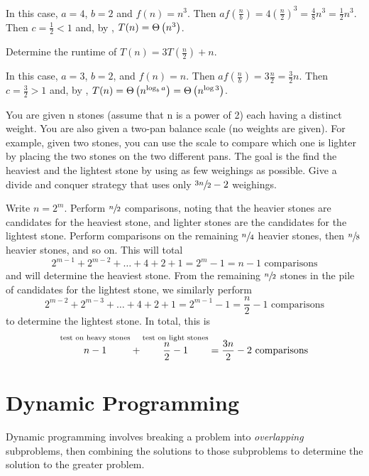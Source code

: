 \begin{solution}
    In this case, $a=4$, $b=2$ and $f(n)=n^3$. Then $af(\frac{n}{b})=4\left(\frac{n}{2}\right)^3=\frac{4}{8}n^3=\frac{1}{2}n^3$. Then $c=\frac{1}{2}<1$ and, by , $T(n)=\Theta\left(n^3\right)$.
\end{solution}

\begin{exercise}{}{}
    Determine the runtime of $T(n)=3T(\frac{n}{2})+n$.
\end{exercise}

\begin{solution}
    In this case, $a=3$, $b=2$, and $f(n)=n$. Then $af(\frac{n}{b})=3\frac{n}{2}=\frac{3}{2}n$. Then $c=\frac{3}{2}>1$ and, by , $T(n)=\Theta\left(n^{\log_b a}\right)=\Theta\left(n^{\log{3}}\right)$.
\end{solution}

\begin{exercise}{}{}
    You are given n stones (assume that n is a power of 2) each having a distinct weight. You are also given a two-pan balance scale (no weights are given). For example, given two stones, you can use the scale to compare which one is lighter by placing the two stones on the two different pans. The goal is the find the heaviest and the lightest stone by using as few weighings as possible. Give a divide and conquer strategy that uses only $\sfrac{3n}{2}-2$ weighings.
\end{exercise}

\begin{solution}
    Write $n=2^m$. Perform $\sfrac{n}{2}$ comparisons, noting that the heavier stones are candidates for the heaviest stone, and lighter stones are the candidates for the lightest stone. Perform comparisons on the remaining $\sfrac{n}{4}$ heavier stones, then $\sfrac{n}{8}$ heavier stones, and so on. This will total \[2^{m-1}+2^{m-2}+\hdots+4+2+1=2^m-1=n-1 \text{ comparisons}\] and will determine the heaviest stone. From the remaining $\sfrac{n}{2}$ stones in the pile of candidates for the lightest stone, we similarly perform \[2^{m-2}+2^{m-3}+\hdots+4+2+1=2^{m-1}-1=\frac{n}{2}-1 \text{ comparisons}\] to determine the lightest stone. In total, this is \[\overset{\text{test on heavy stones}}{\vphantom{\frac{n}{2}}n-1} + \overset{\text{test on light stones}}{\frac{n}{2}-1}=\frac{3n}{2}-2\text{ comparisons}\]
\end{solution}

\section{Dynamic Programming}
Dynamic programming involves breaking a problem into \textit{overlapping} subproblems, then combining the solutions to those subproblems to determine the solution to the greater problem.
